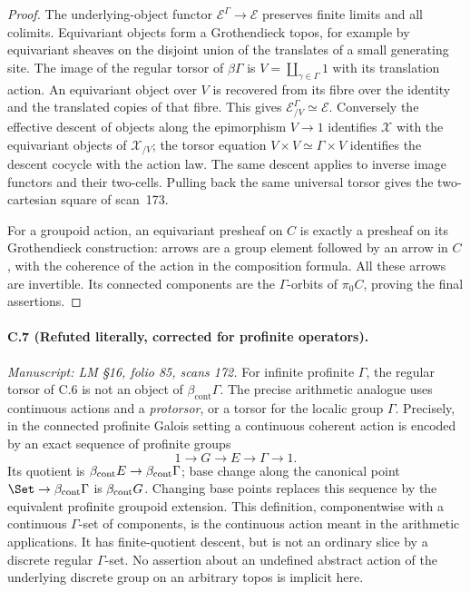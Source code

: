 \begin{proof}
The underlying-object functor
$\mathcal E^\Gamma\to\mathcal E$ preserves finite
limits and all colimits. Equivariant objects
form a Grothendieck topos, for example by
equivariant sheaves on the disjoint union
of the translates of a small generating
site. The image of the regular torsor of
$\beta\Gamma$ is $V=\coprod_{\gamma\in\Gamma}1$
with its translation action. An equivariant
object over $V$ is recovered from its fibre
over the identity and the translated copies
of that fibre. This gives
$\mathcal E^\Gamma_{/V}\simeq\mathcal E$.
Conversely the effective descent of objects
along the epimorphism $V\to1$ identifies
$\mathcal X$ with the equivariant objects
of $\mathcal X_{/V}$; the torsor equation
$V\times V\simeq\Gamma\times V$ identifies
the descent cocycle with the action law.
The same descent applies to inverse image
functors and their two-cells. Pulling back
the same universal torsor gives the
two-cartesian square of scan~173.

For a groupoid action, an equivariant
presheaf on $C$ is exactly a presheaf on
its Grothendieck construction: arrows are
a group element followed by an arrow in
$C$, with the coherence of the action in
the composition formula. All these arrows
are invertible. Its connected components
are the $\Gamma$-orbits of $\pi_0C$,
proving the final assertions.
\end{proof}

\paragraph{C.7 (Refuted literally, corrected for profinite operators).}\label{C7}
\textit{Manuscript: LM \S16, folio 85, scans 172.}
For infinite profinite $\Gamma$, the regular torsor
of C.6 is not an object of
$\beta_{\mathrm{cont}}\Gamma$. The precise arithmetic
analogue uses continuous actions and a
\emph{protorsor}, or a torsor for the localic
group $\Gamma$. Precisely, in the connected profinite
Galois setting a continuous coherent action is encoded by
an exact sequence of profinite groups
\[
 1\longrightarrow G\longrightarrow E\longrightarrow\Gamma
 \longrightarrow1.
\]
Its quotient is $\beta_{\rm cont}E\to\beta_{\rm cont}\Gamma$;
base change along the canonical point
$\Set\to\beta_{\rm cont}\Gamma$ is $\beta_{\rm cont}G$.
Changing base points replaces this sequence by the
equivalent profinite groupoid extension. This definition,
componentwise with a continuous $\Gamma$-set of components,
is the continuous action meant in the arithmetic applications.
It has finite-quotient descent, but is not an ordinary slice
by a discrete regular $\Gamma$-set. No assertion about an
undefined abstract action of the underlying discrete group
on an arbitrary topos is implicit here.

